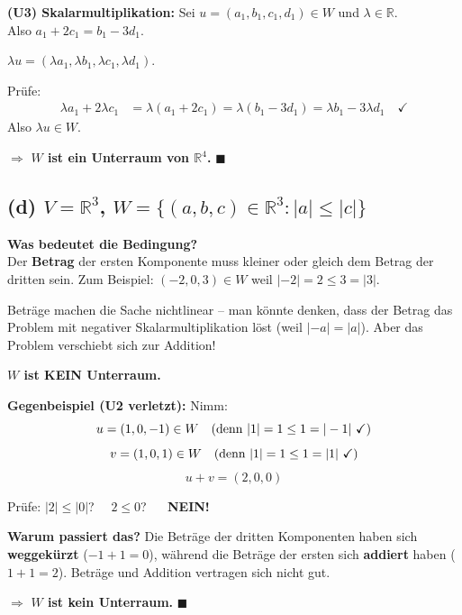 \documentclass[a4paper,12pt]{article}
\begin{document}
\textbf{(U3) Skalarmultiplikation:} Sei $u = (a_1, b_1, c_1, d_1) \in W$ und $\lambda \in \mathbb{R}$.\\
Also $a_1 + 2c_1 = b_1 - 3d_1$.

$\lambda u = (\lambda a_1, \lambda b_1, \lambda c_1, \lambda d_1)$.

Pr\"ufe:
\begin{align*}
\lambda a_1 + 2 \lambda c_1 &= \lambda(a_1 + 2c_1) = \lambda(b_1 - 3d_1) = \lambda b_1 - 3\lambda d_1 \quad \checkmark
\end{align*}
Also $\lambda u \in W$.

\medskip
$\Rightarrow$ \textbf{$W$ ist ein Unterraum von $\mathbb{R}^4$.} \hfill $\blacksquare$

\subsection*{(d) \quad $V = \mathbb{R}^3$, \quad $W = \{(a,b,c) \in \mathbb{R}^3 : |a| \leq |c|\}$}

\textbf{Was bedeutet die Bedingung?}\\
Der \textbf{Betrag} der ersten Komponente muss kleiner oder gleich dem Betrag der dritten sein. Zum Beispiel: $(-2, 0, 3) \in W$ weil $|-2| = 2 \leq 3 = |3|$.

Betr\"age machen die Sache nichtlinear -- man k\"onnte denken, dass der Betrag das Problem mit negativer Skalarmultiplikation l\"ost (weil $|-a| = |a|$). Aber das Problem verschiebt sich zur Addition!

\textbf{$W$ ist KEIN Unterraum.}

\textbf{Gegenbeispiel (U2 verletzt):} Nimm:
\[
u = (1, 0, -1) \in W \quad \text{(denn } |1| = 1 \leq 1 = |-1| \text{ \checkmark)}
\]
\[
v = (1, 0, 1) \in W \quad \text{(denn } |1| = 1 \leq 1 = |1| \text{ \checkmark)}
\]
\[
u + v = (2, 0, 0)
\]

Pr\"ufe: $|2| \leq |0|$? $\quad 2 \leq 0$? $\quad$ \textbf{NEIN!} \quad \Lightning

\textbf{Warum passiert das?} Die Betr\"age der dritten Komponenten haben sich \textbf{weggek\"urzt} ($-1 + 1 = 0$), w\"ahrend die Betr\"age der ersten sich \textbf{addiert} haben ($1 + 1 = 2$). Betr\"age und Addition vertragen sich nicht gut.

$\Rightarrow$ \textbf{$W$ ist kein Unterraum.} \hfill $\blacksquare$

\end{document}
